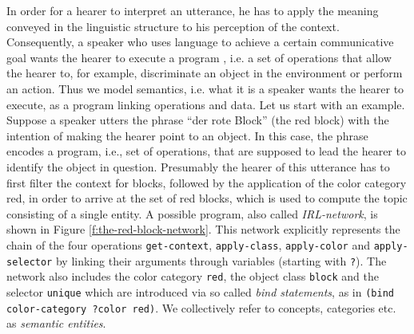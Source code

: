 In order for a hearer to interpret an utterance, he has to apply the 
meaning conveyed in the linguistic structure to his perception of 
the context. Consequently, a speaker who 
uses language to achieve a certain communicative goal wants 
the hearer to execute a program \citep{johnson1977procedural}, 
i.e. a set of operations that allow the hearer to, for example, discriminate 
an object in the environment or perform an action. Thus we model semantics, 
i.e. what it is a speaker wants the hearer to execute, as a 
program linking operations and data.  Let us start with an example. 
Suppose a speaker utters the phrase ``der rote Block'' (the red block) with the intention 
of making the hearer point to an object. In this case, the phrase 
encodes a program, i.e., set of operations, that are supposed to lead 
the hearer to identify the object in question. Presumably
the hearer of this utterance has to first filter the context for blocks, 
followed by the application of the color category
red, in order to arrive at the set of red blocks, which is used to 
compute the topic consisting of a single entity. A possible program, 
also called \emph{IRL-network}, is shown in Figure \ref{f:the-red-block-network}.
This network explicitly represents the chain of the four operations {\footnotesize\tt get-context},
{\footnotesize\tt apply-class}, {\footnotesize\tt apply-color} and {\footnotesize\tt apply-selector}
by linking their arguments through variables 
(starting with {\footnotesize\tt ?}). The network also 
includes the color category {\footnotesize\tt red}, 
the object class {\footnotesize\tt block} and the selector 
{\footnotesize\tt unique} which are introduced via so called 
\emph{bind statements}, as in 
{\footnotesize\tt (bind color-category ?color red)}. We collectively
refer to concepts, categories etc. as \emph{semantic entities}.

